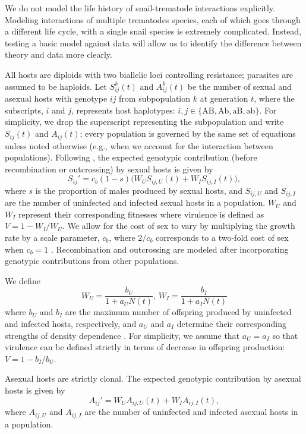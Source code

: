 \documentclass{article}\usepackage[]{graphicx}\usepackage[]{color}
\begin{document}
We do not model the life history of snail-trematode interactions explicitly.
Modeling interactions of multiple trematodes species, each of which goes through a different life cycle, with a single snail species is extremely complicated.
Instead, testing a basic model against data will allow us to identify the difference between theory and data more clearly.

All hosts are diploids with two biallelic loci controlling resistance; parasites are assumed to be haploids.
Let $S_{ij}^k(t)$ and $A_{ij}^k(t)$ be the number of sexual and asexual hosts with genotype $ij$ from subpopulation $k$ at generation $t$, 
where the subscripts, $i$ and $j$, represents host haplotypes: $i, j \in \{\mathrm{AB}, \mathrm{Ab}, \mathrm{aB}, \mathrm{ab}\}$.
For simplicity, we drop the superscript representing the subpopulation and write $S_{ij}(t)$ and $A_{ij}(t)$;
every population is governed by the same set of equations unless noted otherwise (e.g., when we account for the interaction between populations).
Following \cite{lively2010epidemiological}, the expected genotypic contribution (before recombination or outcrossing) by sexual hosts is given by
\begin{equation}
S_{ij}' = c_b (1-s) \bigg(W_U S_{ij,U} (t) + W_I S_{ij,I} (t)\bigg),
\end{equation}
where $s$ is the proportion of males produced by sexual hosts, and $S_{ij, U}$ and $S_{ij,I}$ are the number of uninfected and infected sexual hosts in a population.
$W_U$ and $W_I$ represent their corresponding fitnesses where virulence is defined as $V = 1-W_I/W_U$.
We allow for the cost of sex to vary by multiplying the growth rate by a scale parameter, $c_b$, where $2/c_b$ corresponds to a two-fold cost of sex when $c_b = 1$ \citep{ashby2015diversity}.
Recombination and outcrossing are modeled after incorporating genotypic contributions from other populations.

We define
$$
W_U = \frac{b_U}{1 + a_U N(t)},\,  W_I = \frac{b_I}{1 + a_I N(t)}
$$
where $b_U$ and $b_I$ are the maximum number of offspring produced by uninfected and infected hosts, respectively, and $a_U$ and $a_I$ determine their corresponding strengths of density dependence \citep{smith1973stability, lively2010epidemiological}.
For simplicity, we assume that $a_U = a_I$ so that virulence can be defined strictly in terms of decrease in offspring production: $V = 1- b_I/b_U$.

Asexual hosts are strictly clonal.
The expected genotypic contribution by asexual hosts is given by
\begin{equation}
A_{ij}' = W_U A_{ij,U} (t) + W_I A_{ij,I} (t),
\end{equation}
where $A_{ij, U}$ and $A_{ij,I}$ are the number of uninfected and infected asexual hosts in a population.
\end{document}
